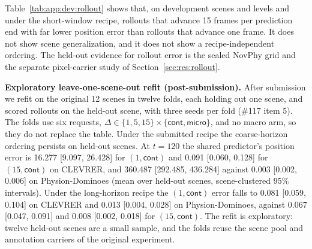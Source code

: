 \begin{revblock}
Table~\ref{tab:app:dev:rollout} shows that, on development scenes and levels and under the short-window recipe, rollouts that advance 15 frames per prediction end with far lower position error than rollouts that advance one frame. It does not show scene generalization, and it does not show a recipe-independent ordering. The held-out evidence for rollout error is the sealed NovPhy grid and the separate pixel-carrier study of Section~\ref{sec:res:rollout}.

\textbf{Exploratory leave-one-scene-out refit (post-submission).} After submission we refit on the original 12 scenes in twelve folds, each holding out one scene, and scored rollouts on the held-out scene, with three seeds per fold (\#117 item 5). The folds use six requests, $\Delta\in\{1,5,15\}\times\{\textsf{cont},\textsf{micro}\}$, and no macro arm, so they do not replace the table. Under the submitted recipe the coarse-horizon ordering persists on held-out scenes. At $t=120$ the shared predictor's position error is 16.277 [9.097, 26.428] for $(1,\textsf{cont})$ and 0.091 [0.060, 0.128] for $(15,\textsf{cont})$ on CLEVRER, and 360.487 [292.485, 436.284] against 0.003 [0.002, 0.006] on Physion-Dominoes (mean over held-out scenes, scene-clustered 95\% intervals). Under the long-horizon recipe the $(1,\textsf{cont})$ error falls to 0.081 [0.059, 0.104] on CLEVRER and 0.013 [0.004, 0.028] on Physion-Dominoes, against 0.067 [0.047, 0.091] and 0.008 [0.002, 0.018] for $(15,\textsf{cont})$. The refit is exploratory: twelve held-out scenes are a small sample, and the folds reuse the scene pool and annotation carriers of the original experiment.
\end{revblock}

\subsubsection{\texorpdfstring{}{Fixed-Request Ordering AUC on the Development Inventories}}
\label{sec:app:dev:grid}

